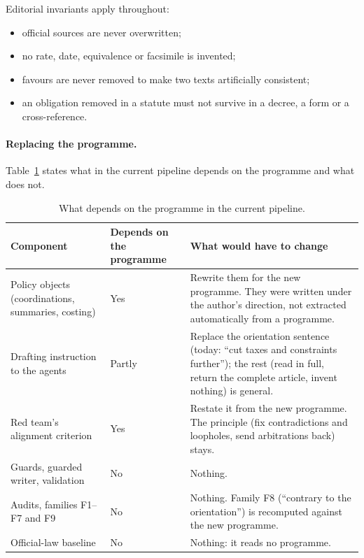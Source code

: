 \documentclass[11pt,a4paper]{article}
\begin{document}
Editorial invariants apply throughout:
\begin{itemize}
  \item official sources are never overwritten;
  \item no rate, date, equivalence or facsimile is invented;
  \item favours are never removed to make two texts artificially consistent;
  \item an obligation removed in a statute must not survive in a decree, a form or a cross-reference.
\end{itemize}

\paragraph{Replacing the programme.}
Table~\ref{tab:portability} states what in the current pipeline depends on the programme and what does not.

\begin{table}[ht]
\centering
\small
\begin{tabularx}{\linewidth}{>{\raggedright\arraybackslash}p{4.3cm}>{\raggedright\arraybackslash}p{2.4cm}>{\raggedright\arraybackslash}X}
\toprule
Component & Depends on the programme & What would have to change\\
\midrule
Policy objects (coordinations, summaries, costing) & Yes & Rewrite them for the new programme. They were written under the author's direction, not extracted automatically from a programme.\\
Drafting instruction to the agents & Partly & Replace the orientation sentence (today: ``cut taxes and constraints further''); the rest (read in full, return the complete article, invent nothing) is general.\\
Red team's alignment criterion & Yes & Restate it from the new programme. The principle (fix contradictions and loopholes, send arbitrations back) stays.\\
Guards, guarded writer, validation & No & Nothing.\\
Audits, families F1--F7 and F9 & No & Nothing. Family F8 (``contrary to the orientation'') is recomputed against the new programme.\\
Official-law baseline & No & Nothing: it reads no programme.\\
\bottomrule
\end{tabularx}
\caption{What depends on the programme in the current pipeline.}
\label{tab:portability}
\end{table}
\end{document}
